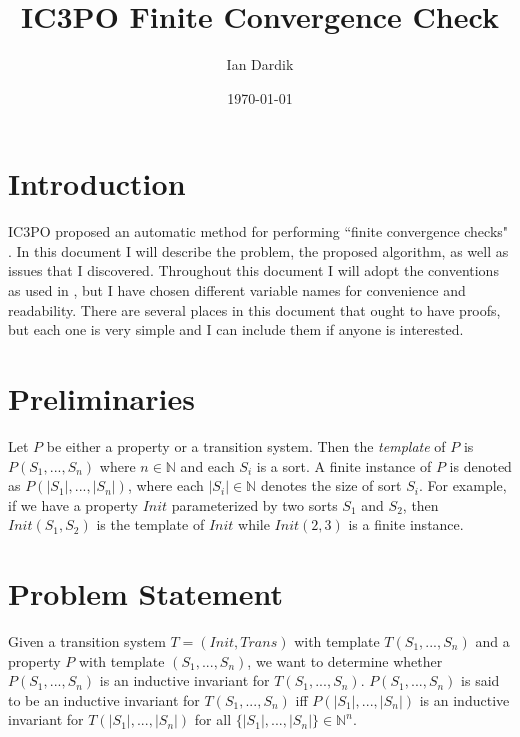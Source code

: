 \documentclass[12pt]{article}
\title{IC3PO Finite Convergence Check}
\author{Ian Dardik}
\date{\today}
\begin{document}
\maketitle

\section{Introduction}
IC3PO proposed an automatic method for performing ``finite convergence checks" \cite{goel2021symmetry}.  In this document I will describe the problem, the proposed algorithm, as well as issues that I discovered.  Throughout this document I will adopt the conventions as used in \cite{goel2021symmetry}, but I have chosen different variable names for convenience and readability.  There are several places in this document that ought to have proofs, but each one is very simple and I can include them if anyone is interested.

\section{Preliminaries}
Let $P$ be either a property or a transition system.  Then the \textit{template} of $P$ is $P(S_1,...,S_n)$ where $n \in \mathbb{N}$ and each $S_i$ is a sort.  A finite instance of $P$ is denoted as $P(|S_1|,...,|S_n|)$, where each $|S_i| \in \mathbb{N}$ denotes the size of sort $S_i$.  For example, if we have a property $Init$ parameterized by two sorts $S_1$ and $S_2$, then $Init(S_1,S_2)$ is the template of $Init$ while $Init(2,3)$ is a finite instance.

\section{Problem Statement}
\label{stmt}
Given a transition system $T = (Init,Trans)$ with template $T(S_1,...,S_n)$ and a property $P$ with template $(S_1,...,S_n)$, we want to determine whether $P(S_1,...,S_n)$ is an inductive invariant for $T(S_1,...,S_n)$.  $P(S_1,...,S_n)$ is said to be an inductive invariant for $T(S_1,...,S_n)$ iff $P(|S_1|,...,|S_n|)$ is an inductive invariant for $T(|S_1|,...,|S_n|)$ for all $\{|S_1|,...,|S_n|\} \in \mathbb{N}^n$.
\end{document}
